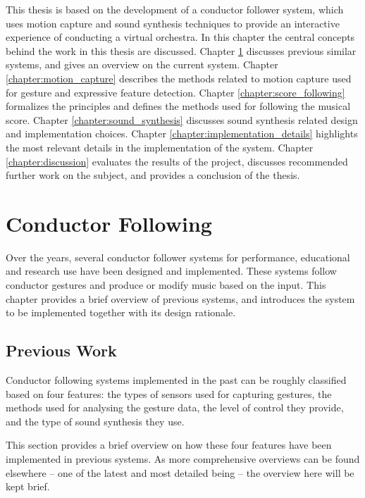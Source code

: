 This thesis is based on the development of
a conductor follower system,
which uses motion capture and sound synthesis techniques
to provide an interactive experience of conducting a virtual orchestra.
In this chapter the central concepts behind
the work in this thesis are discussed.
Chapter \ref{chapter:conductor_following} discusses
previous similar systems, and gives an overview on the current system.
Chapter \ref{chapter:motion_capture} describes the
methods related to motion capture used for
gesture and expressive feature detection.
Chapter \ref{chapter:score_following}
formalizes the principles
and defines the methods used for following the musical score.
Chapter \ref{chapter:sound_synthesis}
discusses sound synthesis related design and
implementation choices.
Chapter \ref{chapter:implementation_details}
highlights the most relevant details
in the implementation of the system.
Chapter \ref{chapter:discussion}
evaluates the results of the project,
discusses recommended further work on the subject,
and provides a conclusion of the thesis.

\chapter{Conductor Following}
\label{chapter:conductor_following}

Over the years, several conductor follower systems for
performance, educational and research use have been designed and implemented.
These systems follow conductor gestures
and produce or modify music based on the input.
This chapter provides a brief overview of previous systems,
and introduces the system to be implemented together with its design rationale.

\section{Previous Work}

Conductor following systems implemented in the past
can be roughly classified based on four features:
the types of sensors used for capturing gestures,
the methods used for analysing the gesture data,
the level of control they provide, and
the type of sound synthesis they use.

This section provides a brief overview on how these four features
have been implemented in previous systems.
As more comprehensive overviews can be found elsewhere --
one of the latest and most detailed being \cite{Fabiani2012} --
the overview here will be kept brief.

